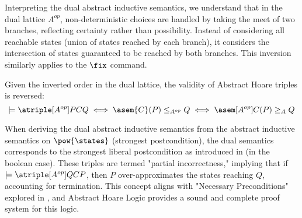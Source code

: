 Interpreting the dual abstract inductive semantics, we understand that in the
dual lattice \( A^{op} \), non-deterministic choices are handled by taking the
meet of two branches, reflecting certainty rather than possibility. Instead of
considering all reachable states (union of states reached by each branch), it
considers the intersection of states guaranteed to be reached by both branches.
This inversion similarly applies to the \( \fix \) command.

Given the inverted order in the dual lattice, the validity of Abstract Hoare
triples is reversed:
$$\models \atriple[A^{op}]{P}{C}{Q} \iff \asem{C}(P) \leq_{A^{op}} Q \iff \asem[A^{op}]{C}(P) \geq_A Q$$

When deriving the dual abstract inductive semantics from the abstract
inductive semantics on \( \pow{\states} \) (strongest postcondition), the dual
semantics corresponds to the strongest liberal postcondition as introduced in
\cite{Zhang22} (in the boolean case). These triples are termed "partial
incorrectness," implying that if \( \models \atriple[A^{op}]{Q}{C}{P} \), then
\( P \) over-approximates the states reaching \( Q \), accounting for
termination. This concept aligns with "Necessary Preconditions" explored in
\cite{Cousot13}, and Abstract Hoare Logic provides a sound and complete
proof system for this logic.

